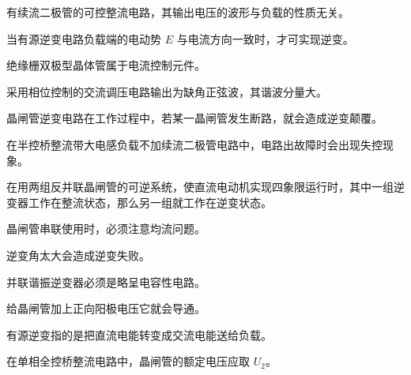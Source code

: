 \documentclass[电力电子]{subfiles}
\begin{document}
	\begin{ti}
		有续流二极管的可控整流电路，其输出电压的波形与负载的性质无关。\dui
	\end{ti}

	\begin{ti}
		当有源逆变电路负载端的电动势 $E$ 与电流方向一致时，才可实现逆变。\dui
	\end{ti}

	\begin{ti}
		绝缘栅双极型晶体管属于电流控制元件。\cuo
	\end{ti}

	\begin{ti}
		采用相位控制的交流调压电路输出为缺角正弦波，其谐波分量大。\dui
	\end{ti}

	\begin{ti}
		晶闸管逆变电路在工作过程中，若某一晶闸管发生断路，就会造成逆变颠覆。\dui
	\end{ti}

	\begin{ti}
		在半控桥整流带大电感负载不加续流二极管电路中，电路出故障时会出现失控现象。\dui
	\end{ti}

	\begin{ti}
		在用两组反并联晶闸管的可逆系统，使直流电动机实现四象限运行时，其中一组逆变器工作在整流状态，那么另一组就工作在逆变状态。\cuo
	\end{ti}

	\begin{ti}
		晶闸管串联使用时，必须注意均流问题。\cuo
	\end{ti}

	\begin{ti}
		逆变角太大会造成逆变失败。\cuo
	\end{ti}

	\begin{ti}
		并联谐振逆变器必须是略呈电容性电路。\dui
	\end{ti}

	\begin{ti}
		给晶闸管加上正向阳极电压它就会导通。\cuo
	\end{ti}

	\begin{ti}
		有源逆变指的是把直流电能转变成交流电能送给负载。\cuo
	\end{ti}

	\begin{ti}
		在单相全控桥整流电路中，晶闸管的额定电压应取 $U_{2}$。\cuo
	\end{ti}
\end{document}
